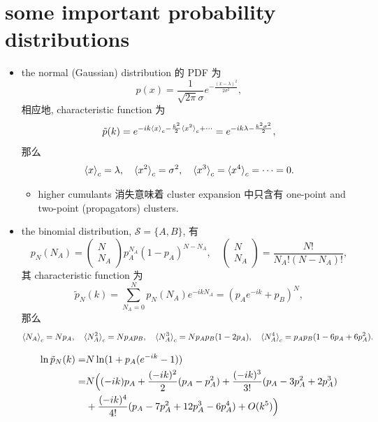 \section{some important probability distributions}
\begin{itemize}
	\item the normal (Gaussian) distribution 的 PDF 为
	\begin{equation} \label{A.3.1}
		p(x) = \frac{1}{\sqrt{2 \pi} \sigma} e^{- \frac{(x - \lambda)^2}{2 \sigma^2}},
	\end{equation}
	相应地, characteristic function 为
	\begin{equation}
		\tilde{p}(k) = e^{- i k \braket{x}_c - \frac{k^2}{2} \braket{x^2}_c + \cdots} = e^{- i k \lambda - \frac{k^2 \sigma^2}{2}},
	\end{equation}
	那么
	\begin{equation}
		\braket{x}_c = \lambda, \quad \braket{x^2}_c = \sigma^2, \quad \braket{x^3}_c = \braket{x^4}_c = \cdots = 0.
	\end{equation}
	\begin{itemize}
		\item higher cumulants 消失意味着 cluster expansion 中只含有 one-point and two-point (propagators) clusters.
	\end{itemize}
	
	\item the binomial distribution, $\mathcal{S} = \{A, B\}$, 有
	\begin{equation}
		p_N(N_A) = \begin{pmatrix}
			N \\
			N_A
		\end{pmatrix} p_A^{N_A} (1 - p_A)^{N - N_A}, \quad \begin{pmatrix}
			N \\
			N_A
		\end{pmatrix} = \frac{N!}{N_A! (N - N_A)!},
	\end{equation}
	其 characteristic function 为
	\begin{equation}
		\tilde{p}_N(k) = \sum_{N_A = 0}^N p_N(N_A) e^{- i k N_A} = (p_A e^{- i k} + p_B)^N,
	\end{equation}
	那么
	\begin{equation}
		\braket{N_A}_c = N p_A, \quad \braket{N_A^2}_c = N p_A p_B, \quad \braket{N_A^3}_c = N p_A p_B (1 - 2 p_A), \quad \braket{N_A^4}_c = p_A p_B (1 - 6 p_A + 6 p_A^2).
	\end{equation}
	
	\begin{tcolorbox}[title=calculation:]
		\begin{align}
			\ln \tilde{p}_N(k) =& N \ln(1 + p_A (e^{- i k} - 1)) \notag \\
			=& N \Big( (- i k) p_A + \frac{(- i k)^2}{2} (p_A - p_A^2) + \frac{(- i k)^3}{3!} (p_A - 3 p_A^2 + 2 p_A^3) \notag \\
			& + \frac{(- i k)^4}{4!} (p_A - 7 p_A^2 + 12 p_A^3 - 6 p_A^4) + O(k^5) \Big)
		\end{align}
	\end{tcolorbox}
	

\end{itemize}
